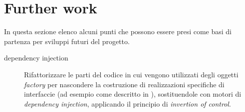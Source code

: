 
\section{Further work}

In questa sezione elenco alcuni punti che possono essere presi come
basi di partenza per sviluppi futuri del progetto. 

\begin{description}
\item[dependency injection] Rifattorizzare le parti del codice in cui
  vengono utilizzati degli oggetti \emph{factory} per nascondere la
  costruzione di realizzazioni specifiche di interfaccie (ad esempio
  come descritto in ),
  sostituendole con motori di \emph{dependency injection}, applicando
  il principio di \emph{invertion of control}.
\end{description}
